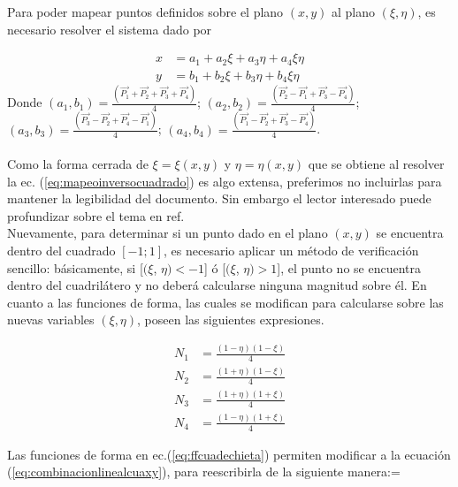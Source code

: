 Para poder mapear puntos definidos sobre el plano $(x,y)$ al plano $(\xi, \eta)$, es necesario resolver el sistema dado por 

\begin{equation}
  \label{eq:mapeoinversocuadrado}
  \begin{split}
    x & = a_1 + a_2\xi + a_3\eta + a_4\xi\eta \\
    y & = b_1 + b_2\xi + b_3\eta + b_4\xi\eta
  \end{split}
\end{equation}
Donde $(a_1, b_1)= \frac{(\vec{P_1} + \vec{P_2} + \vec{P_3} +
  \vec{P_4})}{4}$; $(a_2, b_2)=  \frac{(\vec{P_2} - \vec{P_1} + \vec{P_3} -
  \vec{P_4})}{4}$; $(a_3, b_3)= \frac{(\vec{P_3} - \vec{P_2} + \vec{P_4} -
  \vec{P_1})}{4} $; $(a_4, b_4)= \frac{(\vec{P_1} - \vec{P_2} + \vec{P_3} - \vec{P_4})}{4}$. \\ \\
Como la forma cerrada de $\xi= \xi(x,y)$ y $\eta= \eta(x,y)$ que se obtiene al resolver la ec. (\ref{eq:mapeoinversocuadrado}) es algo extensa, preferimos no incluirlas para mantener la legibilidad del documento. Sin embargo el lector interesado puede profundizar sobre el tema en ref.\cite{Hal} \\
Nuevamente, para determinar si un punto dado en el plano $(x,y)$ se encuentra dentro del cuadrado $[-1; 1]$, es necesario aplicar un método de verificación sencillo: básicamente, si [$(\xi$, $\eta) <  -1$] ó [$(\xi$, $\eta) >  1  $], el punto no se encuentra dentro del cuadrilátero y no deberá calcularse ninguna magnitud sobre él. En cuanto a las funciones de forma, las cuales se modifican para calcularse sobre las nuevas variables $(\xi, \eta)$, poseen las siguientes expresiones.

\begin{equation}
  \label{eq:ffcuadechieta}
  \begin{split}
    N_1 & = \frac{ (1-\eta)(1-\xi) }{4} \\
    N_2 & = \frac{ (1+\eta)(1-\xi) }{4} \\
    N_3 & = \frac{ (1+\eta)(1+\xi) }{4} \\
    N_4 & = \frac{ (1-\eta)(1+\xi) }{4} 
  \end{split}
\end{equation}

Las funciones de forma en ec.(\ref{eq:ffcuadechieta}) permiten modificar a la ecuación (\ref{eq:combinacionlinealcuaxy}), para reescribirla de la siguiente manera:=

